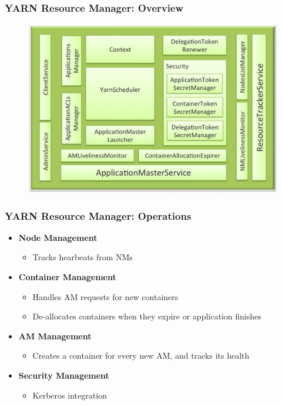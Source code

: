 \begin{frame}
\frametitle{YARN Resource Manager: Overview}
  \begin{figure}[h]
    \centering
    \includegraphics[scale=0.25]{./figures/yarn_RM}
    \label{fig:yarn_RM}
  \end{figure}
\end{frame}

\begin{frame}
\frametitle{YARN Resource Manager: Operations}
\begin{itemize}
  \item {\bf Node Management}
  \begin{itemize}
    \item Tracks hearbeats from NMs
  \end{itemize}
  \item {\bf Container Management}
  \begin{itemize}
    \item Handles AM requests for new containers
    \item De-allocates containers when they expire or application finishes
  \end{itemize}
  \item {\bf AM Management}
  \begin{itemize}
    \item Creates a container for every new AM, and tracks its health
  \end{itemize}
  \item {\bf Security Management}
  \begin{itemize}
    \item Kerberos integration
  \end{itemize}
\end{itemize}
\end{frame}

